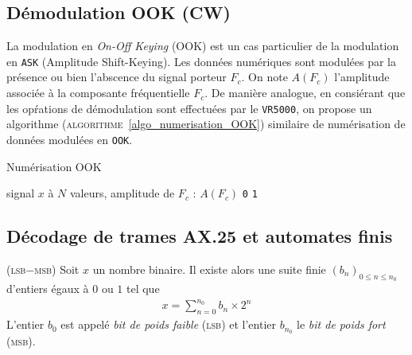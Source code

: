 \documentclass[twocolumn,pre,floats,aps,amsmath,amssymb]{revtex4}
\newenvironment{definition}[1][D\'efinition.]{\begin{trivlist}
\item[\hskip \labelsep {\bfseries #1}]}{\end{trivlist}}
\begin{document}
\subsection{D\'emodulation OOK (CW)}

La modulation en \textit{On-Off Keying} (OOK) est un cas particulier de la modulation en \texttt{ASK} (Amplitude Shift-Keying). Les donn\'ees num\'eriques sont modul\'ees par la pr\'esence ou bien l'abscence du signal porteur $F_c$. On note $A(F_c)$ l'amplitude associ\'ee \`a la composante fr\'equentielle $F_c$. De mani\`ere analogue, en consi\'erant que les op\'rations de d\'emodulation sont effectu\'ees par le \texttt{VR5000}, on propose un algorithme (\textsc{algorithme}~\ref{algo_numerisation_OOK}) similaire de num\'erisation de donn\'ees modul\'ees en \texttt{OOK}.

\begin{algorithm}[h]
\caption{Num\'erisation OOK}
\label{algo_numerisation_OOK}
\begin{algorithmic}[1]
  \REQUIRE signal $x$ \`a $N$ valeurs, amplitude de $F_c$ : $A(F_c)$
  \RETURN \texttt{0}
  \ELSE
  \RETURN \texttt{1}
  \ENDIF
\end{algorithmic}
\end{algorithm}

\subsection{D\'ecodage de trames AX.25 et automates finis}

\begin{definition}
  { \color{rltred}{\Radioactivity} }
  \textsc{(lsb$-$msb)}
  Soit $x$ un nombre binaire. Il existe alors une suite finie $\left ( b_n \right )_{0 \leq n \leq n_0}$ d'entiers \'egaux \`a $0$ ou $1$ tel que
  \begin{eqnarray*}
    x = \sum^{n_0}_{n = 0}{b_n \times 2^n}
  \end{eqnarray*}
  L'entier $b_0$ est appel\'e \textit{bit de poids faible} (\textsc{lsb}) et l'entier $b_{n_0}$ le \textit{bit de poids fort} (\textsc{msb}).
\end{definition}
\end{document}
